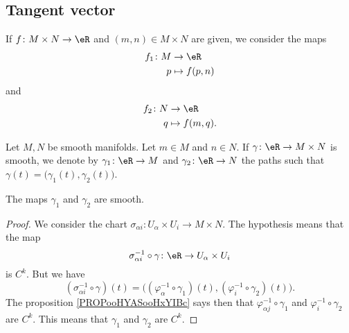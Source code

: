 \subsection{Tangent vector}


\begin{normaltext}		\label{NORMooPEHNooAiyUqc}
	If \(f \colon M\times N\to  \eR  \) and \( (m,n)\in M\times N\) are given, we consider the maps
	\begin{equation}
		\begin{aligned}
			f_1\colon M & \to \eR        \\
			p           & \mapsto f(p,n)
		\end{aligned}
	\end{equation}
	and \begin{equation}
		\begin{aligned}
			f_2\colon N & \to \eR         \\
			q           & \mapsto f(m,q).
		\end{aligned}
	\end{equation}
\end{normaltext}

\begin{lemma}	\label{LEMooYUUCooDsSyuO}
	Let \( M,N\) be smooth manifolds. Let \( m\in M\) and \( n\in N\). If \(\gamma \colon \eR\to M\times N  \) is smooth, we denote by \(\gamma_1 \colon \eR\to M  \) and \(\gamma_2 \colon \eR\to N  \) the paths such that \( \gamma(t)=\big( \gamma_1(t),\gamma_2(t) \big)\).

	The maps \( \gamma_1\) and \( \gamma_2\) are smooth.
\end{lemma}

\begin{proof}
	We consider the chart \(\sigma_{\alpha i} \colon U_{\alpha}\times U_i\to M\times N  \). The hypothesis means that the map
	\begin{equation}
		\sigma_{\alpha i}^{-1}\circ \gamma \colon \eR\to  U_{\alpha}\times U_i
	\end{equation}
	is \( C^k\). But we have
	\begin{equation}
		(\sigma_{\alpha i}^{-1}\circ \gamma)(t)=\Big( (\varphi_{\alpha}^{-1}\circ \gamma_1)(t),(\varphi_i^{-1}\circ\gamma_2)(t) \Big).
	\end{equation}
	The proposition \ref{PROPooHYASooHxYIBc} says then that \( \varphi_{\alpha j}^{-1}\circ \gamma_1\) and \( \varphi_i^{-1}\circ\gamma_2\) are \( C^k\). This means that \( \gamma_1\) and \( \gamma_2\) are \( C^k\).
\end{proof}

